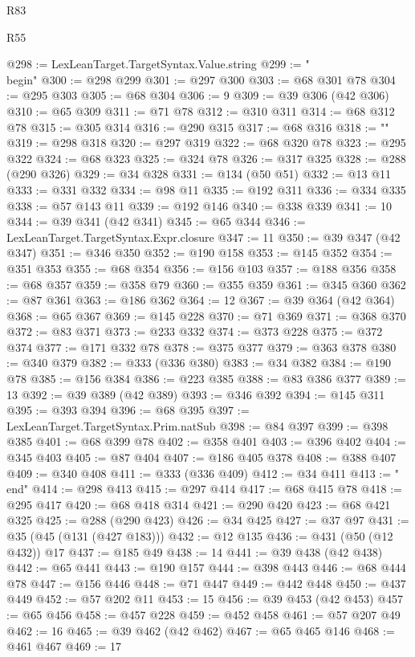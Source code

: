 \begin{lexlean}{R83}
\begin{lexlean}{R55}
\begin{coremodule}
{{{{{{{{{{{{{{{{{{{{{{{{{{{{{{{{{{{{{{{{{{{{{{{{{{{{{{{{{{{{@298 := LexLeanTarget.TargetSyntax.Value.string
@299 := "\\begin{"
@300 := @298 @299
@301 := @297 @300
@303 := @68 @301 @78
@304 := @295 @303
@305 := @68 @304
@306 := 9
@309 := @39 @306 (@42 @306)
@310 := @65 @309
@311 := @71 @78
@312 := @310 @311
@314 := @68 @312 @78
@315 := @305 @314
@316 := @290 @315
@317 := @68 @316
@318 := "}"
@319 := @298 @318
@320 := @297 @319
@322 := @68 @320 @78
@323 := @295 @322
@324 := @68 @323
@325 := @324 @78
@326 := @317 @325
@328 := @288 (@290 @326)
@329 := @34 @328
@331 := @134 (@50 @51)
@332 := @13 @11
@333 := @331 @332
@334 := @98 @11
@335 := @192 @311
@336 := @334 @335
@338 := @57 @143 @11
@339 := @192 @146
@340 := @338 @339
@341 := 10
@344 := @39 @341 (@42 @341)
@345 := @65 @344
@346 := LexLeanTarget.TargetSyntax.Expr.closure
@347 := 11
@350 := @39 @347 (@42 @347)
@351 := @346 @350
@352 := @190 @158
@353 := @145 @352
@354 := @351 @353
@355 := @68 @354
@356 := @156 @103
@357 := @188 @356
@358 := @68 @357
@359 := @358 @79
@360 := @355 @359
@361 := @345 @360
@362 := @87 @361
@363 := @186 @362
@364 := 12
@367 := @39 @364 (@42 @364)
@368 := @65 @367
@369 := @145 @228
@370 := @71 @369
@371 := @368 @370
@372 := @83 @371
@373 := @233 @332
@374 := @373 @228
@375 := @372 @374
@377 := @171 @332 @78
@378 := @375 @377
@379 := @363 @378
@380 := @340 @379
@382 := @333 (@336 @380)
@383 := @34 @382
@384 := @190 @78
@385 := @156 @384
@386 := @223 @385
@388 := @83 @386 @377
@389 := 13
@392 := @39 @389 (@42 @389)
@393 := @346 @392
@394 := @145 @311
@395 := @393 @394
@396 := @68 @395
@397 := LexLeanTarget.TargetSyntax.Prim.natSub
@398 := @84 @397
@399 := @398 @385
@401 := @68 @399 @78
@402 := @358 @401
@403 := @396 @402
@404 := @345 @403
@405 := @87 @404
@407 := @186 @405 @378
@408 := @388 @407
@409 := @340 @408
@411 := @333 (@336 @409)
@412 := @34 @411
@413 := "\\end{"
@414 := @298 @413
@415 := @297 @414
@417 := @68 @415 @78
@418 := @295 @417
@420 := @68 @418 @314
@421 := @290 @420
@423 := @68 @421 @325
@425 := @288 (@290 @423)
@426 := @34 @425
@427 := @37 @97
@431 := @35 (@45 (@131 (@427 @183)))
@432 := @12 @135
@436 := @431 (@50 (@12 @432)) @17
@437 := @185 @49
@438 := 14
@441 := @39 @438 (@42 @438)
@442 := @65 @441
@443 := @190 @157
@444 := @398 @443
@446 := @68 @444 @78
@447 := @156 @446
@448 := @71 @447
@449 := @442 @448
@450 := @437 @449
@452 := @57 @202 @11
@453 := 15
@456 := @39 @453 (@42 @453)
@457 := @65 @456
@458 := @457 @228
@459 := @452 @458
@461 := @57 @207 @49
@462 := 16
@465 := @39 @462 (@42 @462)
@467 := @65 @465 @146
@468 := @461 @467
@469 := 17
}}}}}}}}}}}}}}}}}}}}}}}}}}}}}}}}}}}}}}}}}}}}}}}}}}}}}}}}}}}}}
\end{coremodule}
\end{lexlean}
\end{lexlean}
